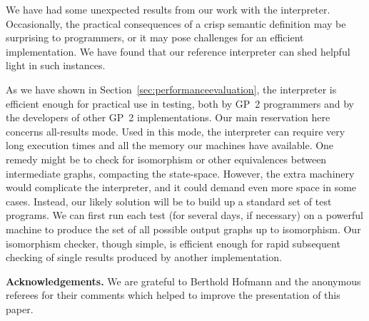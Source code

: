 We have had some unexpected results from our work with the interpreter.
Occasionally, the practical consequences of a crisp semantic definition
may be surprising to programmers, or it may pose challenges for an efficient
implementation.
We have found that our reference interpreter can shed helpful light in
such instances.

As we have shown in Section~\ref{sec:performanceevaluation}, the interpreter is efficient enough for practical use in testing,
both by GP~2 programmers and by the developers of other GP~2 implementations.
Our main reservation here concerns all-results mode.
Used in this mode, the interpreter can require very long execution times and all the memory our machines have available.
One remedy might be to check for isomorphism or other equivalences
between intermediate graphs, compacting the state-space.
However, the extra machinery would complicate the interpreter, and it
could demand even more space in some cases.
Instead, our likely solution will be to build up a standard set of test programs.
We can first run each test (for several days, if necessary)
on a powerful machine to produce the set of all possible output graphs up to isomorphism.
Our isomorphism checker, though simple, is efficient enough for rapid
subsequent checking of single results produced by another implementation.

\vspace{\baselineskip}
\noindent\textbf{Acknowledgements.} We are grateful to Berthold Hofmann and the anonymous referees for their comments which helped to improve the presentation of this paper.